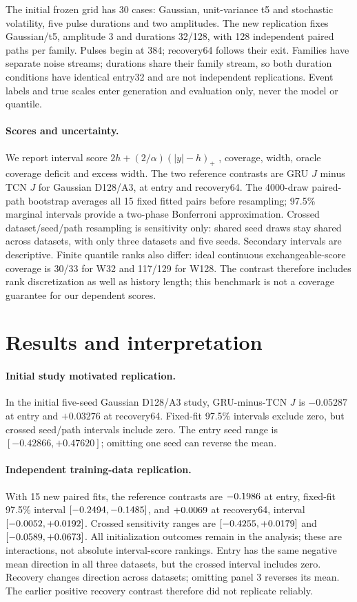 \documentclass{article}
\begin{document}
The initial frozen grid has 30 cases: Gaussian, unit-variance t5 and stochastic
volatility, five pulse durations and two amplitudes. The new replication
fixes Gaussian/t5, amplitude 3 and durations 32/128, with 128 independent
paired paths per family. Pulses begin at 384; recovery64 follows their exit.
Families have separate noise streams; durations share their family stream,
so both duration conditions have identical entry32 and are not independent
replications. Event labels and true scales enter generation and evaluation
only, never the model or quantile.

\paragraph{Scores and uncertainty.}
We report interval score $2h+(2/\alpha)(|y|-h)_+$ \citep{gneiting},
coverage, width, oracle coverage deficit and excess width.
The two reference contrasts are GRU $J$ minus TCN $J$ for Gaussian D128/A3,
at entry and recovery64. The 4000-draw paired-path bootstrap averages all 15
fixed fitted pairs before resampling; 97.5\% marginal intervals provide a
two-phase Bonferroni approximation. Crossed dataset/seed/path resampling is
sensitivity only: shared seed draws stay shared across datasets, with only
three datasets and five seeds. Secondary intervals are descriptive.
Finite quantile ranks also differ: ideal continuous exchangeable-score
coverage is 30/33 for W32 and 117/129 for W128. The contrast therefore includes
rank discretization as well as history length; this benchmark is not a
coverage guarantee for our dependent scores.

\clearpage
\section{Results and interpretation}
\paragraph{Initial study motivated replication.}
In the initial five-seed Gaussian D128/A3 study, GRU-minus-TCN $J$ is
$-0.05287$ at entry and $+0.03276$ at recovery64.
Fixed-fit 97.5\% intervals exclude zero, but crossed seed/path intervals
include zero. The entry seed range is $[-0.42866,+0.47620]$;
omitting one seed can reverse the mean.

\paragraph{Independent training-data replication.}
With 15 new paired fits, the reference contrasts are
$-0.1986$ at entry, fixed-fit 97.5\% interval
$[-0.2494,-0.1485]$, and $+0.0069$ at recovery64,
interval $[-0.0052,+0.0192]$.
Crossed sensitivity ranges are
$[-0.4255,+0.0179]$ and
$[-0.0589,+0.0673]$.
All initialization outcomes remain in the analysis; these are interactions,
not absolute interval-score rankings.
Entry has the same negative mean direction in all three datasets, but the
crossed interval includes zero. Recovery changes direction across datasets;
omitting panel 3 reverses its mean. The earlier positive recovery contrast
therefore did not replicate reliably.
\end{document}
